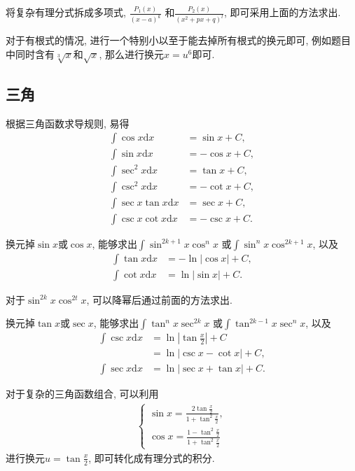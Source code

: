 \documentclass[UTF8,a4paper,11pt]{ctexart}
\begin{document}
      将复杂有理分式拆成多项式, 
      $\frac{P_1\left(x\right)}{\left(x-a\right)^{k}}$
      和$\frac{P_2\left(x\right)}{\left(x^{2}+px+q\right)^{l}}$, 
      即可采用上面的方法求出.

      对于有根式的情况,
      进行一个特别小以至于能去掉所有根式的换元即可,
      例如题目中同时含有$\sqrt[3]{x}$和$\sqrt{x}$,
      那么进行换元$x=u^{6}$即可.

    \subsection{三角}
      根据三角函数求导规则, 易得
      \[
      \begin{aligned}
        \int \cos x \mathrm{d}x&=\sin x+C,\\
        \int \sin x \mathrm{d}x&=-\cos x+C,\\
        \int \sec ^{2}x \mathrm{d}x&=\tan x+C,\\
        \int \csc ^{2}x \mathrm{d}x&=-\cot x+C,\\
        \int \sec x \tan x \mathrm{d}x&=\sec x+C,\\
        \int \csc x \cot x \mathrm{d}x&=-\csc x+C.
      \end{aligned}
      \]

      换元掉$\sin x$或$\cos x$, 能够求出$\int \sin ^{2k+1}x \cos^{n} x$
      或$\int \sin ^{n}x \cos ^{2k+1}x$, 以及
      \[
      \begin{aligned}
        \int \tan x \mathrm{d}x&=-\ln \left| \cos x \right|+C,\\
        \int \cot x \mathrm{d}x&=\ln \left| \sin x \right|+C.
      \end{aligned}
      \]

      对于$\sin ^{2k}x \cos ^{2t}x$, 可以降幂后通过前面的方法求出.

      换元掉$\tan x$或$\sec x$, 能够求出$\int \tan ^{n}x \sec ^{2k}x$
      或$\int \tan ^{2k-1}x \sec ^{n}x$, 以及
      \[
      \begin{aligned}
        \int \csc x \mathrm{d}x&=\ln \left| \tan \frac{x}{2} \right|+C
        \\&=\ln \left| \csc x -\cot x \right|+C,\\
        \int \sec x \mathrm{d}x&=\ln \left| \sec x + \tan x \right|+C.
      \end{aligned}
      \]

      对于复杂的三角函数组合, 可以利用
      \[
      \begin{aligned}
        \begin{cases}
          \sin x=\frac{2\tan \frac{x}{2}}{1+\tan ^{2}\frac{x}{2}},\\
          \cos x=\frac{1-\tan ^{2}\frac{x}{2}}{1+\tan ^{2}\frac{x}{2}}
        \end{cases}
      \end{aligned}
      \]
      进行换元$u=\tan \frac{x}{2}$, 
      即可转化成有理分式的积分.
\end{document}
